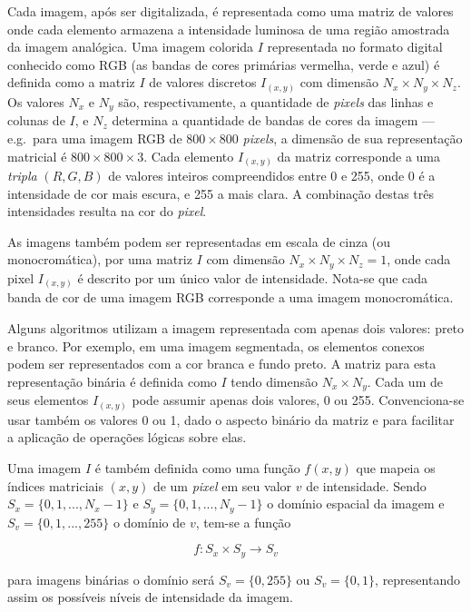 Cada imagem, após ser digitalizada, é representada como uma matriz de
valores onde cada elemento armazena a intensidade luminosa de uma
região amostrada da imagem analógica. Uma imagem colorida $I$
representada no formato digital conhecido como RGB (as bandas de cores
primárias vermelha, verde e azul) é definida como a matriz $I$ de
valores discretos $I_{(x,y)}$ com dimensão $N_x \times N_y \times
N_z$. Os valores $N_x$ e $N_y$ são, respectivamente, a quantidade
de \textit{pixels} das linhas e colunas de $I$, e $N_z$ determina a
quantidade de bandas de cores da imagem --- e.g.\ para uma imagem RGB
de $800 \times 800$ \textit{pixels}, a dimensão de sua representação
matricial é $800 \times 800 \times 3$. Cada elemento $I_{(x,y)}$ da
matriz corresponde a uma \emph{tripla} $(R, G, B)$ de valores inteiros
compreendidos entre 0 e 255, onde 0 é a intensidade de cor mais
escura, e 255 a mais clara. A combinação destas três intensidades
resulta na cor do \textit{pixel}.

As imagens também podem ser representadas em escala de cinza (ou
monocromática), por uma matriz $I$ com dimensão $N_x \times N_y \times
N_z = 1$, onde cada pixel $I_{(x,y)}$ é descrito por um único valor de
intensidade. Nota-se que cada banda de cor de uma imagem RGB
corresponde a uma imagem monocromática.

Alguns algoritmos utilizam a imagem representada com apenas dois
valores: preto e branco. Por exemplo, em uma imagem segmentada, os
elementos conexos podem ser representados com a cor branca e fundo
preto. A matriz para esta representação binária é definida como $I$
tendo dimensão $N_x \times N_y$. Cada um de seus elementos $I_{(x,y)}$
pode assumir apenas dois valores, 0 ou 255. Convenciona-se usar também
os valores 0 ou 1, dado o aspecto binário da matriz e para facilitar a
aplicação de operações lógicas sobre elas.

Uma imagem $I$ é também definida como uma função $f(x,y)$ que mapeia
os índices matriciais $(x,y)$ de um \textit{pixel} em seu valor $v$ de
intensidade. Sendo $S_x = \{0, 1, ..., N_x - 1\}$ e $S_y = \{0, 1,
..., N_y - 1\}$ o domínio espacial da imagem e $S_v = \{0, 1, ...,
255\}$ o domínio de $v$, tem-se a função

\begin{equation}
  f : S_x \times S_y \to S_v
\end{equation}

\noindent para imagens binárias o domínio será $S_v = \{0, 255\}$ ou $S_v = \{0,
1\}$, representando assim os possíveis níveis de intensidade da
imagem.

